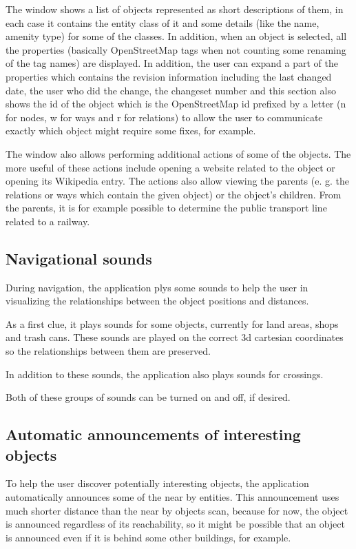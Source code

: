 \documentclass[nolof,digital]{fithesis3}
\begin{document}
The window shows a list of objects represented as short descriptions of them, in each case it contains the entity class of it and some details (like the name, amenity type) for some of the classes. In addition, when an object is selected, all the properties (basically OpenStreetMap tags when not counting some renaming of the tag names) are displayed. In addition, the user can expand a part of the properties which contains the revision information including the last changed date, the user who did the change, the changeset number and this section also shows the id of the object which is the OpenStreetMap id prefixed by a letter (n for nodes, w for ways and r for relations) to allow the user to communicate exactly which object might require some fixes, for example.

The window also allows performing additional actions of some of the objects. The more useful of these actions include opening a website related to the object or opening its Wikipedia entry. The actions also allow viewing the parents (e. g. the relations or ways which contain the given object) or the object's children. From the parents, it is for example possible to determine the public transport line related to a railway.
\subsection{Navigational sounds}
During navigation, the application plys some sounds to help the user in visualizing the relationships between the object positions and distances.

As a first clue, it plays sounds for some objects, currently for land areas, shops and trash cans. These sounds are played on the correct 3d cartesian coordinates so the relationships between them are preserved.

In addition to these sounds, the application also plays sounds for crossings.

Both of these groups of sounds can be turned on and off, if desired.
\subsection{Automatic announcements of interesting objects}
To help the user discover potentially interesting objects, the application automatically announces some of the near by entities. This announcement uses much shorter distance than the near by objects scan, because for now, the object is announced regardless of its reachability, so it might be possible that an object is announced even if it is behind some other buildings, for example.
\end{document}
